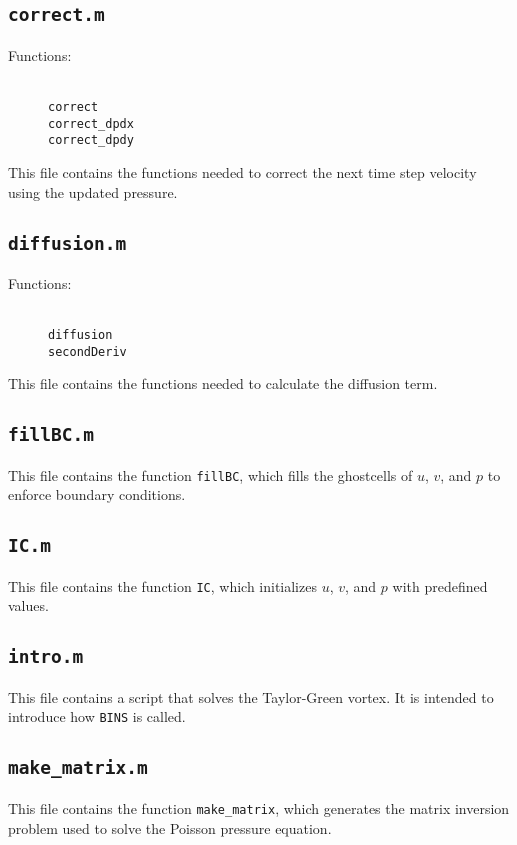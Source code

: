 \documentclass[12pt]{article}
\begin{document}
\subsection{\texttt{correct.m}}
\begin{description}
\item[Functions:] \hfill \\ \texttt{correct} \\ \texttt{correct\_dpdx} \\ \texttt{correct\_dpdy} 
\end{description}
This file contains the functions needed to correct the next time step velocity using the updated pressure.

\subsection{\texttt{diffusion.m}}
\begin{description}
\item[Functions:] \hfill \\ \texttt{diffusion} \\ \texttt{secondDeriv} 
\end{description}
This file contains the functions needed to calculate the diffusion term.

\subsection{\texttt{fillBC.m}}
This file contains the function \texttt{fillBC}, which fills the ghostcells of $u$, $v$, and $p$ to enforce boundary conditions.

\subsection{\texttt{IC.m}}
This file contains the function \texttt{IC}, which initializes $u$, $v$, and $p$ with predefined values.

\subsection{\texttt{intro.m}}
This file contains a script that solves the Taylor-Green vortex.  It is intended to introduce how \texttt{BINS} is called.

\subsection{\texttt{make\_matrix.m}}
This file contains the function \texttt{make\_matrix}, which generates the matrix inversion problem used to solve the Poisson pressure equation.
\end{document}
